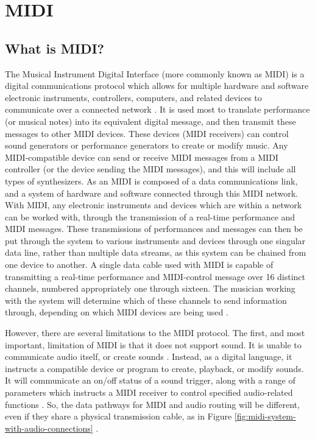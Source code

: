 \section[MIDI: An Introduction]{MIDI}\label{section:midi}

\subsection[What is MIDI?]{What is MIDI?}\label{section:what-midi}
The Musical Instrument Digital Interface (more commonly known as MIDI) is a digital communications protocol which allows for multiple hardware and software electronic instruments, controllers, computers, and related devices to communicate over a connected network \cite{Huber_2012}. It is used most to translate performance  (or musical notes) into its equivalent digital message, and then transmit these messages to other MIDI devices. These devices (MIDI receivers) can control sound generators or performance generators to create or modify music. Any MIDI-compatible device can send or receive MIDI messages from a MIDI controller (or the device sending the MIDI messages), and this will include all types of synthesizers. As an  MIDI is composed of a data communications link, and a system of hardware and software connected through this MIDI network. With MIDI, any electronic instruments and devices which are within a network can be worked with, through the transmission of a real-time performance and MIDI messages. These transmissions of performances and messages can then be put through the system to various instruments and devices through one singular data line, rather than multiple data streams, as this system can be chained from one device to another. A single data cable used with MIDI is capable of transmitting a real-time performance and MIDI-control message over 16 distinct channels, numbered appropriately one through sixteen. The musician working with the system will determine which of these channels to send information through, depending on which MIDI devices are being used \cite{Romano_2003}.

However, there are several limitations to the MIDI protocol. The first, and most important, limitation of MIDI is that it does not support sound. It is unable to communicate audio itself, or create sounds \cite{Huber_2012}. Instead, as a digital language, it instructs a compatible device or program to create, playback, or modify sounds. It will communicate an on/off status of a sound trigger, along with a range of parameters which instructs a MIDI receiver to control specified audio-related functions \cite{Kirk_Hunt_2013}. So, the data pathways for MIDI and audio routing will be different, even if they share a physical transmission cable, as in Figure \ref{fig:midi-system-with-audio-connections} \cite{Huber_2012}. 

